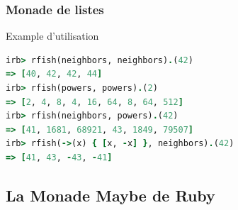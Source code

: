 \documentclass{beamer}
\begin{document}
\begin{frame}[fragile]
  \frametitle{Monade de listes}
  \begin{exampleblock}{Example d'utilisation}
    \begin{lstlisting}[language=ruby]
irb> rfish(neighbors, neighbors).(42)
=> [40, 42, 42, 44]
irb> rfish(powers, powers).(2)
=> [2, 4, 8, 4, 16, 64, 8, 64, 512]
irb> rfish(neighbors, powers).(42)
=> [41, 1681, 68921, 43, 1849, 79507]
irb> rfish(->(x) { [x, -x] }, neighbors).(42)
=> [41, 43, -43, -41]
    \end{lstlisting}
  \end{exampleblock}
\end{frame}

\subsection{La Monade Maybe de Ruby}
\end{document}
